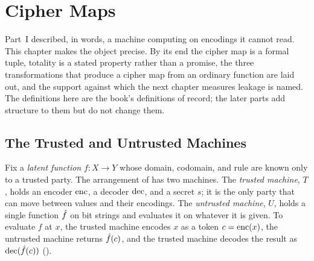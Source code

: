 
\chapter{Cipher Maps}
\label{ch:cipher-maps}

Part~I described, in words, a machine computing on encodings it cannot
read. This chapter makes the object precise. By its end the cipher map is a
formal tuple, totality is a stated property rather than a promise, the three
transformations that produce a cipher map from an ordinary function are laid
out, and the support against which the next chapter measures leakage is
named. The definitions here are the book's definitions of record; the later
parts add structure to them but do not change them.

\section{The Trusted and Untrusted Machines}
\label{sec:machines}

Fix a \emph{latent function} $f : X \to Y$ whose domain, codomain, and rule
are known only to a trusted party. The arrangement of
 has two machines. The \emph{trusted machine},
$T$, holds an encoder $\operatorname{enc}$, a decoder $\operatorname{dec}$, and a secret $s$; it is the
only party that can move between values and their encodings. The
\emph{untrusted machine}, $U$, holds a single function $\hat{f}$ on bit
strings and evaluates it on whatever it is given. To evaluate $f$ at $x$,
the trusted machine encodes $x$ as a token $c = \operatorname{enc}(x)$, the untrusted
machine returns $\hat{f}(c)$, and the trusted machine decodes the result as
$\operatorname{dec}(\hat{f}(c))$ ().

